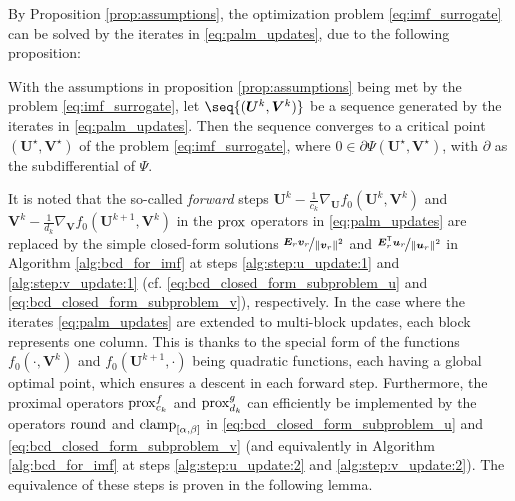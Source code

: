 By Proposition \ref{prop:assumptions}, the optimization problem \eqref{eq:imf_surrogate} can be solved by the iterates in \eqref{eq:palm_updates}, due to the following proposition:
\begin{prop}\label{prop:convergence}
    With the assumptions in proposition \ref{prop:assumptions} being met by the problem \eqref{eq:imf_surrogate}, let $\seq{(\bm U^k, \bm V^k)}$ be a sequence generated by the iterates in \eqref{eq:palm_updates}. Then the sequence converges to a critical point $(\bm U^\star, \bm V^\star)$ of the problem \eqref{eq:imf_surrogate}, where $0 \in \partial \Psi(\bm U^\star, \bm V^\star)$, with $\partial$ as the subdifferential of $\Psi$.
\end{prop}

It is noted that the so-called \emph{forward} steps $\bm U^k - \frac{1}{c_k} \nabla_{\bm U} f_0(\bm U^k, \bm V^k)$ and $\bm V^k - \frac{1}{d_k} \nabla_{\bm V} f_0(\bm U^{k+1}, \bm V^k)$ in the $\operatorname{prox}$ operators in \eqref{eq:palm_updates} are replaced by the simple closed-form solutions $\nicefrac{\bm{E}_r \bm{v}_r}{\lVert \bm{v}_r \rVert^2}$ and $\nicefrac{\bm{E}_r^\mathsf{T} \bm{u}_r}{\lVert \bm{u}_r \rVert^2}$ in Algorithm \ref{alg:bcd_for_imf} at steps \ref{alg:step:u_update:1} and \ref{alg:step:v_update:1} (cf. \eqref{eq:bcd_closed_form_subproblem_u} and \eqref{eq:bcd_closed_form_subproblem_v}), respectively. In the case where the iterates \eqref{eq:palm_updates} are extended to multi-block updates, each block represents one column. This is thanks to the special form of the functions $f_0(\cdot, \bm V^k)$ and $f_0(\bm U^{k+1}, \cdot)$ being quadratic functions, each having a global optimal point, which ensures a descent in each forward step.
Furthermore, the proximal operators $\operatorname{prox}^f_{c_k}$ and $\operatorname{prox}^g_{d_k}$ can efficiently be implemented by the operators $\operatorname{round}$ and $\operatorname{clamp}_{[\alpha,\beta]}$ in \eqref{eq:bcd_closed_form_subproblem_u} and \eqref{eq:bcd_closed_form_subproblem_v} (and equivalently in Algorithm \ref{alg:bcd_for_imf} at steps \ref{alg:step:u_update:2} and \ref{alg:step:v_update:2}). The equivalence of these steps is proven in the following lemma.

